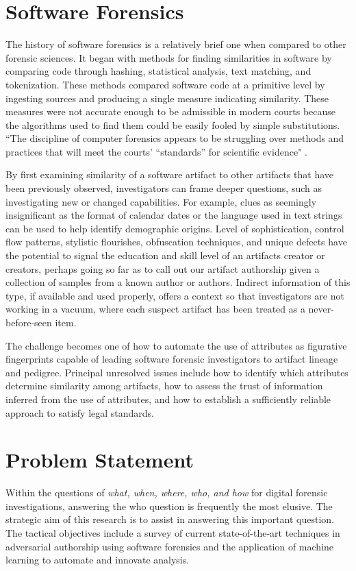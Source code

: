 \documentclass[12pt]{report}
\begin{document}
\section{Software Forensics}
  The history of software forensics is a relatively brief one when compared to other forensic sciences.  It began with methods for finding similarities in software by comparing code through hashing, statistical analysis, text matching, and tokenization.  These methods compared software code at a primitive level by ingesting sources and producing a single measure indicating similarity.  These measures were not accurate enough to be admissible in modern courts because the algorithms used to find them could be easily fooled by simple substitutions.  ``The discipline of computer forensics appears to be struggling over methods and practices that will meet the courts’ “standards” for scientific evidence" \cite{meyers2005digital}.

By first examining similarity of a software artifact to other artifacts that have been previously observed, investigators can frame deeper questions, such as investigating new or changed capabilities.  For example, clues as seemingly insignificant as the format of calendar dates or the language used in text strings can be used to help identify demographic origins.  Level of sophistication, control flow patterns, stylistic flourishes, obfuscation techniques, and unique defects have the potential to signal the education and skill level of an artifacts creator or creators, perhaps going so far as to call out our artifact authorship given a collection of samples from a known author or authors.  Indirect information of this type, if available and used properly, offers a context so that investigators are not working in a vacuum, where each suspect artifact has been treated as a never-before-seen item.

The challenge becomes one of how to automate the use of attributes as figurative fingerprints capable of leading software forensic investigators to artifact lineage and pedigree.  Principal unresolved issues include how to identify which attributes determine similarity among artifacts, how to assess the trust of information inferred from the use of attributes, and how to establish a sufficiently reliable approach to satisfy legal standards.

\section{Problem Statement}
\label{sec:ProbState}
Within the questions of \emph{what, when, where, who, and how} for digital forensic investigations, answering the who question is frequently the most elusive.  The strategic aim of this research is to assist in answering this important question.  The tactical objectives include a survey of current state-of-the-art techniques in adversarial authorship using software forensics and the application of machine learning to automate and innovate analysis.
\end{document}

